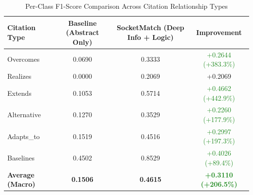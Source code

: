 \begin{table}[htbp]
\centering
\caption{Per-Class F1-Score Comparison Across Citation Relationship Types}
\label{tab:classwise_results}
\begin{tabular}{lccc}
\toprule
\textbf{Citation Type} & \textbf{Baseline \small(Abstract Only)} & \textbf{SocketMatch \small(Deep Info + Logic)} & \textbf{Improvement} \\
\midrule
Overcomes & 0.0690 & 0.3333 & \textcolor{ForestGreen}{+0.2644 (+383.3\%)} \\
Realizes & 0.0000 & 0.2069 & +0.2069 \\
Extends & 0.1053 & 0.5714 & \textcolor{ForestGreen}{+0.4662 (+442.9\%)} \\
Alternative & 0.1270 & 0.3529 & \textcolor{ForestGreen}{+0.2260 (+177.9\%)} \\
Adapts_to & 0.1519 & 0.4516 & \textcolor{ForestGreen}{+0.2997 (+197.3\%)} \\
Baselines & 0.4502 & 0.8529 & \textcolor{ForestGreen}{+0.4026 (+89.4\%)} \\
\midrule
\textbf{Average (Macro)} & \textbf{0.1506} & \textbf{0.4615} & \textbf{\textcolor{ForestGreen}{+0.3110 (+206.5\%)}} \\
\bottomrule
\end{tabular}
\end{table}